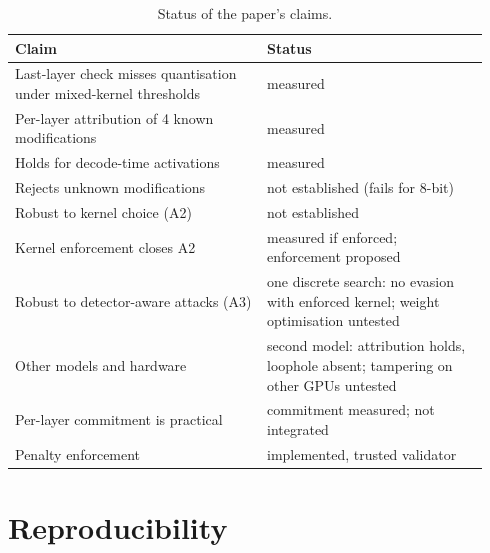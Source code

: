 \documentclass[10pt,twocolumn]{article}
\begin{document}
\begin{table}[!htb]
\centering
\small
\caption{Status of the paper's claims.}
\label{tab:status}
\begin{tabular}{@{}>{\raggedright\arraybackslash}p{0.5\linewidth}>{\raggedright\arraybackslash}p{0.44\linewidth}@{}}
\toprule
Claim & Status \\
\midrule
Last-layer check misses quantisation under mixed-kernel thresholds & measured \\
Per-layer attribution of 4 known modifications & measured \\
Holds for decode-time activations & measured \\
Rejects unknown modifications & not established (fails for 8-bit) \\
Robust to kernel choice (A2) & not established \\
Kernel enforcement closes A2 & measured if enforced; enforcement proposed \\
Robust to detector-aware attacks (A3) & one discrete search: no evasion with enforced kernel; weight optimisation untested \\
Other models and hardware & second model: attribution holds, loophole absent; tampering on other GPUs untested \\
Per-layer commitment is practical & commitment measured; not integrated \\
Penalty enforcement & implemented, trusted validator \\
\bottomrule
\end{tabular}
\end{table}




\appendix
\section{Reproducibility}
\end{document}
